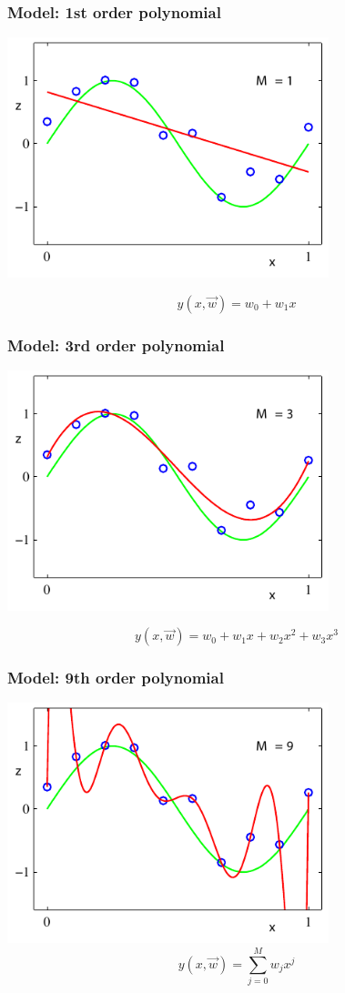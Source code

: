 \documentclass[USenglish,pdftex,compress,10pt,svgnamesi,handout]{beamer}
\begin{document}
\begin{frame}
    \frametitle{Model: 1st order polynomial}
    
\begin{center}
	\includegraphics[width=0.7\textwidth]{pics/linreg-Figure1_4b}
	
	\alert{\[y(x,\Vec{w}) = w_0 + w_1 x\]}
\end{center}
\end{frame}
\begin{frame}
    \frametitle{Model: 3rd order polynomial}
    
\begin{center}
	\includegraphics[width=0.7\textwidth]{pics/linreg-Figure1_4c}
	
	\alert{\[y(x,\Vec{w}) = w_0 + w_1 x + w_2 x^2 +  w_3 x^3\]}
\end{center}
\end{frame}
\begin{frame}
    \frametitle{Model: 9th order polynomial}
    
\begin{center}
	\includegraphics[width=0.7\textwidth]{pics/linreg-Figure1_4d}
	\alert{\[y(x,\Vec{w}) = \sum_{j=0}^M w_j x^j\]}
\end{center}
\end{frame}
\end{document}
